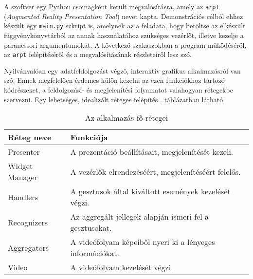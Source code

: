
A szoftver egy Python csomagként került megvalósításra, amely az \texttt{arpt} (\textit{Augmented Reality Presentation Tool}) nevet kapta.
Demonstrációs célból ehhez készült egy \texttt{main.py} szkript is, amelynek az a feladata, hogy betöltse az elkészült függvénykönyvtárból az annak használatához szükséges vezérlőt, illetve kezelje a parancssori argumentumokat.
A következő szakaszokban a program működéséről, az \texttt{arpt} felépítéséről és a megvalósításának részleteiről lesz szó.

Nyilvánvalóan egy adatfeldolgozást végző, interaktív grafikus alkalmazásról van szó.
Ennek megfelelően érdemes külön kezelni az ezen funkciókhoz tartozó kódrészeket, a feldolgozási- és megjelenítési folyamatot valahogyan rétegekbe szervezni.
Egy lehetséges, idealizált réteges felépítés . táblázatban látható.

\begin{table}[h!]
\centering
\caption{Az alkalmazás fő rétegei}
\label{tab:layers}
\smallskip
\begin{tabular}{|l|l|}
\hline
\textbf{Réteg neve} & \textbf{Funkciója} \\
\hline
Presenter & A prezentáció beállításait, megjelenítését kezeli. \\
Widget Manager & A vezérlők elrendezéséért, megjelenítéséért felelős. \\
Handlers & A gesztusok által kiváltott események kezelését végzi. \\
Recognizers & Az aggregált jellegek alapján ismeri fel a gesztusokat. \\
Aggregators & A videófolyam képeiből nyeri ki a lényeges információkat. \\
Video & A videófolyam kezelését végzi. \\
\hline
\end{tabular}
\end{table}

